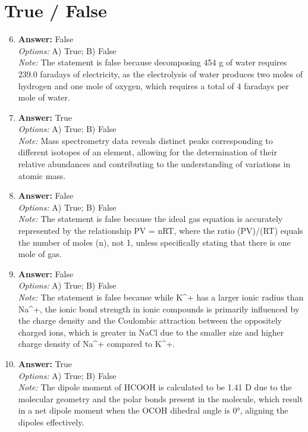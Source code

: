 \documentclass[12pt]{article}
\begin{document}
\section*{True / False}
\begin{enumerate}[label=\arabic*.]
\setcounter{enumi}{5}
\item \textbf{Answer:} False
\\ \textit{Options:} A) True; B) False
\\ \textit{Note:} The statement is false because decomposing 454 g of water requires 239.0 faradays of electricity, as the electrolysis of water produces two moles of hydrogen and one mole of oxygen, which requires a total of 4 faradays per mole of water.
\item \textbf{Answer:} True
\\ \textit{Options:} A) True; B) False
\\ \textit{Note:} Mass spectrometry data reveals distinct peaks corresponding to different isotopes of an element, allowing for the determination of their relative abundances and contributing to the understanding of variations in atomic mass.
\item \textbf{Answer:} False
\\ \textit{Options:} A) True; B) False
\\ \textit{Note:} The statement is false because the ideal gas equation is accurately represented by the relationship PV = nRT, where the ratio (PV)/(RT) equals the number of moles (n), not 1, unless specifically stating that there is one mole of gas.
\item \textbf{Answer:} False
\\ \textit{Options:} A) True; B) False
\\ \textit{Note:} The statement is false because while K^+ has a larger ionic radius than Na^+, the ionic bond strength in ionic compounds is primarily influenced by the charge density and the Coulombic attraction between the oppositely charged ions, which is greater in NaCl due to the smaller size and higher charge density of Na^+ compared to K^+.
\item \textbf{Answer:} True
\\ \textit{Options:} A) True; B) False
\\ \textit{Note:} The dipole moment of HCOOH is calculated to be 1.41 D due to the molecular geometry and the polar bonds present in the molecule, which result in a net dipole moment when the OCOH dihedral angle is 0°, aligning the dipoles effectively.
\end{enumerate}
\end{document}
